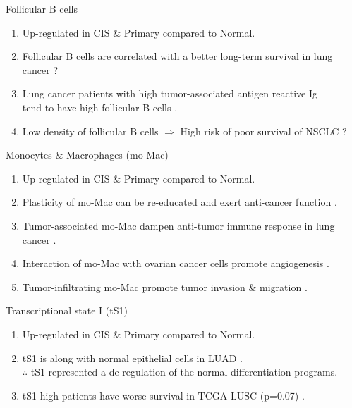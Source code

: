 \documentclass{beamer}
\begin{document}
\begin{frame}[allowframebreaks]
        \begin{block}{Follicular B cells}
            \begin{enumerate}
                \item Up-regulated in CIS \& Primary compared to Normal.
                \item Follicular B cells are correlated with a better long-term survival in lung cancer \cite{Bf-1} ?
                \item Lung cancer patients with high tumor-associated antigen reactive Ig \\
                    tend to have high follicular B cells \cite{Bf-1}.
                \item Low density of follicular B cells $\Rightarrow$ High risk of poor survival of NSCLC \cite{Bcell-2} ?
            \end{enumerate}
        \end{block}

        \begin{block}{Monocytes \& Macrophages (mo-Mac)}
            \begin{enumerate}
                \item Up-regulated in CIS \& Primary compared to Normal.
                \item Plasticity of mo-Mac can be re-educated and exert anti-cancer function \cite{moMac-2}.
                \item Tumor-associated mo-Mac dampen anti-tumor immune response in lung cancer \cite{moMac-1}.
                \item Interaction of mo-Mac with ovarian cancer cells promote angiogenesis \cite{moMac-3}.
                \item Tumor-infiltrating mo-Mac promote tumor invasion \& migration \cite{moMac-4}.
            \end{enumerate}
        \end{block}

        \begin{block}{Transcriptional state I (tS1)}
            \begin{enumerate}
                \item Up-regulated in CIS \& Primary compared to Normal.
                \item tS1 is along with normal epithelial cells in LUAD \cite{singlecell1}. \\
                    $\therefore$ tS1 represented a de-regulation of the normal differentiation programs.
                \item tS1-high patients have worse survival in TCGA-LUSC (p=0.07) \cite{singlecell1}.
            \end{enumerate}
        \end{block}
    \end{frame}
\end{document}
